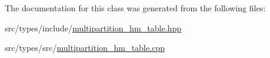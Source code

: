 The documentation for this class was generated from the following files\+:\begin{DoxyCompactItemize}
\item 
src/types/include/\hyperlink{multipartition__hm__table_8hpp}{multipartition\+\_\+hm\+\_\+table.\+hpp}\item 
src/types/src/\hyperlink{multipartition__hm__table_8cpp}{multipartition\+\_\+hm\+\_\+table.\+cpp}\end{DoxyCompactItemize}
